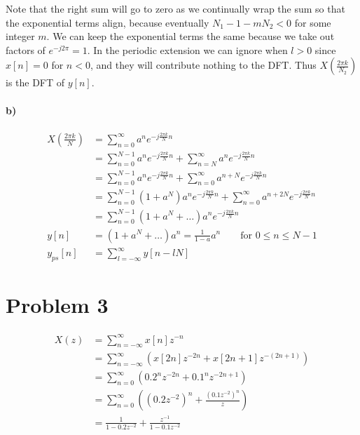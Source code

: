 \documentclass[12pt]{article}
\begin{document}
Note that the right sum will go to zero as we continually wrap the sum so that the exponential terms align, because eventually \(N_1-1-mN_2<0\) for some
integer \(m\). We can keep the exponential terms the same because we take out factors of \(e^{-j2\pi}=1\). In the periodic extension we can
ignore when \(l>0\) since \(x[n]=0\) for \(n<0\), and they will contribute nothing to the DFT. Thus \(X\left(\frac{2\pi k}{N_2}\right)\) is the
DFT of \(y[n]\).

\paragraph{b)}

\begin{align*}
    X\left(\frac{2\pi k}{N}\right)&= \sum_{n=0}^\infty a^n e^{-j\frac{2\pi k}{N} n}\\
    &=\sum_{n=0}^{N-1} a^n e^{-j\frac{2\pi k}{N} n} + \sum_{n=N}^\infty a^n e^{-j\frac{2\pi k}{N} n}\\
    &=\sum_{n=0}^{N-1} a^n e^{-j\frac{2\pi k}{N} n} + \sum_{n=0}^\infty a^{n+N} e^{-j\frac{2\pi k}{N} n}\\
    &=\sum_{n=0}^{N-1} (1+a^N)a^n e^{-j\frac{2\pi k}{N} n} + \sum_{n=0}^\infty a^{n+2N} e^{-j\frac{2\pi k}{N} n}\\
    &=\sum_{n=0}^{N-1} (1+a^N+\ldots)a^n e^{-j\frac{2\pi k}{N} n}\\
    y[n]&=(1+a^N+\ldots)a^n=\frac{1}{1-a}a^n\qquad \text{for } 0\leq n \leq N-1\\
    y_{ps}[n]&=\sum_{l=-\infty}^{\infty}y[n-lN]
\end{align*}

\section*{Problem 3}

\begin{align*}
    X(z) &= \sum_{n=-\infty}^\infty x[n] z^{-n}\\
    &= \sum_{n=-\infty}^\infty (x[2n] z^{-2n} + x[2n + 1] z^{-(2n+1)})\\
    &= \sum_{n=0}^\infty (0.2^nz^{-2n} + 0.1^n z^{-2n+1})\\
    &= \sum_{n=0}^\infty \left(\left(0.2z^{-2}\right)^n + \frac{\left(0.1z^{-2}\right)^n}{z}\right)\\
    &=\frac{1}{1-0.2z^{-2}} + \frac{z^{-1}}{1-0.1z^{-2}}
\end{align*}
\end{document}
